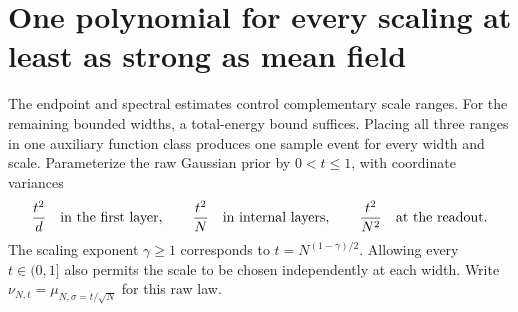 \section{One polynomial for every scaling at least as strong as mean field}
\label{sec:uniform-supercritical}
The endpoint and spectral estimates control complementary scale ranges.
For the remaining bounded widths, a total-energy bound suffices. Placing
all three ranges in one auxiliary function class produces one sample
event for every width and scale. Parameterize the raw
Gaussian prior by $0<t\le1$, with coordinate variances
\[
 \frac{t^2}{d}\quad\hbox{in the first layer},\qquad
 \frac{t^2}{N}\quad\hbox{in internal layers},\qquad
 \frac{t^2}{N^2}\quad\hbox{at the readout}.
\]
The scaling exponent $\gamma\ge1$ corresponds to
$t=N^{(1-\gamma)/2}$. Allowing every $t\in(0,1]$ also permits the scale
to be chosen independently at each width. Write
$\nu_{N,t}=\mu_{N,\sigma=t/\sqrt N}$ for this raw law.

